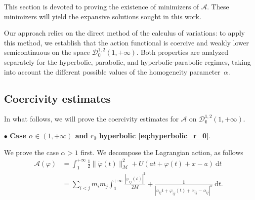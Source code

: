 \documentclass[a4paper,10pt]{amsart}
\newcommand{\ud}{\mathrm{d}}
\theoremstyle{plain}
\theoremstyle{definition}
\numberwithin{equation}{section}
\numberwithin{thm}{section}
\begin{document}
This section is devoted to proving the existence of minimizers of $\mathcal A$. These minimizers will yield the expansive solutions sought in this work. 

Our approach relies on the direct method of the calculus of variations: to apply this method, we establish that the action functional is coercive and weakly lower semicontinuous on the space $\mathcal{D}_0^{1,2}(1,+\infty)$. Both properties are analyzed separately for the hyperbolic, parabolic, and hyperbolic-parabolic regimes, taking into account the different possible values of the homogeneity parameter~$\alpha$.




\subsection{Coercivity estimates}\label{sec:coercivity}

In what follows, we will prove the coercivity estimates for $\mathcal{A}$ on $\mathcal{D}^{1,2}_0(1,+\infty)$.
 
 
\noindent $\bullet$ {\bf Case $\alpha \in (1,+\infty)$ and $r_0$ hyperbolic \eqref{eq:hyperbolic_r_0}}.

We prove the case $\alpha > 1$ first. We decompose the Lagrangian action, as follows
\begin{displaymath}
\begin{split}
    \mathcal{A}(\varphi) &= \int_{1}^{+\infty} \frac{1}{2}\|\dot\varphi(t)\|_\mathcal{M}^2+ U(at + \varphi(t) + x - a)\ \ud t\\
    & = \sum_{i<j} m_i m_j \int_{1}^{+\infty} \frac{|\dot{\varphi}_{ij}(t)|^2}{2M}+ \frac{1}{|a_{ij}t + \varphi_{ij}(t) + x_{ij} - a_{ij}|^\alpha}\ \ud t.
\end{split}
\end{displaymath}
\end{document}
